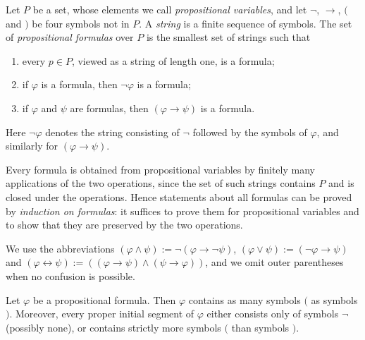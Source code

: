 \begin{definition}\label{logic:definition-propositional-formula}
Let $P$ be a set, whose elements we call \emph{propositional variables}, and
let $\neg$, $\to$, $($ and $)$ be four symbols not in $P$. A \emph{string} is a
finite sequence of symbols. The set of \emph{propositional formulas} over $P$
is the smallest set of strings such that
\begin{enumerate}
\item every $p \in P$, viewed as a string of length one, is a formula;
\item if $\varphi$ is a formula, then $\neg\varphi$ is a formula;
\item if $\varphi$ and $\psi$ are formulas, then $(\varphi \to \psi)$ is a
formula.
\end{enumerate}
Here $\neg\varphi$ denotes the string consisting of $\neg$ followed by the
symbols of $\varphi$, and similarly for $(\varphi \to \psi)$.
\end{definition}

\begin{remark}\label{logic:remark-induction-formulas}
Every formula is obtained from propositional variables by finitely many
applications of the two operations, since the set of such strings contains
$P$ and is closed under the operations. Hence statements about all formulas
can be proved by \emph{induction on formulas}: it suffices to prove them for
propositional variables and to show that they are preserved by the two
operations.
\end{remark}

\begin{notation}\label{logic:notation-connectives}
We use the abbreviations
$(\varphi \wedge \psi) := \neg(\varphi \to \neg\psi)$,
$(\varphi \vee \psi) := (\neg\varphi \to \psi)$ and
$(\varphi \leftrightarrow \psi) := ((\varphi \to \psi) \wedge (\psi \to \varphi))$,
and we omit outer parentheses when no confusion is possible.
\end{notation}

\begin{lemma}\label{logic:lemma-parentheses}
Let $\varphi$ be a propositional formula. Then $\varphi$ contains as many
symbols $($ as symbols $)$. Moreover, every proper initial segment of $\varphi$
either consists only of symbols $\neg$ (possibly none), or contains strictly
more symbols $($ than symbols $)$.
\end{lemma}

